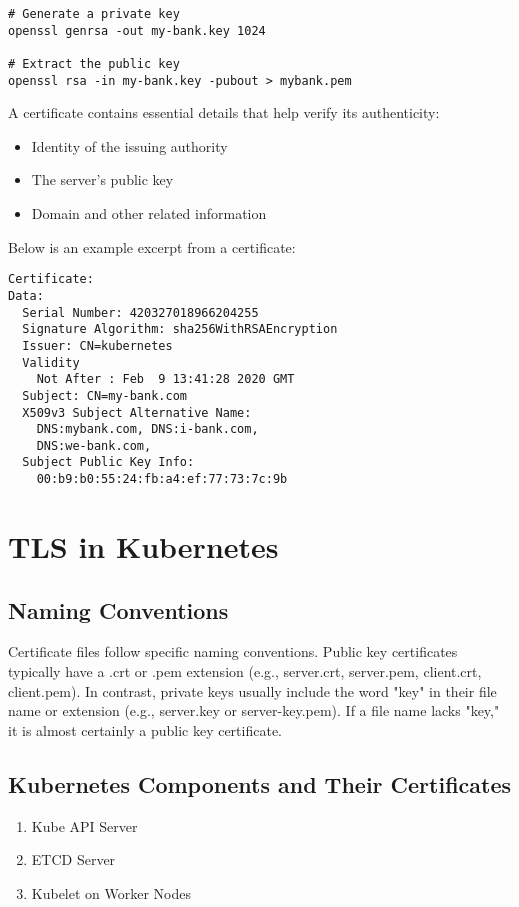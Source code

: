 \documentclass[11pt]{article}
\begin{document}
\begin{verbatim}
# Generate a private key
openssl genrsa -out my-bank.key 1024

# Extract the public key
openssl rsa -in my-bank.key -pubout > mybank.pem
\end{verbatim}

A certificate contains essential details that help verify its authenticity:

\begin{itemize}
\item Identity of the issuing authority
\item The server’s public key
\item Domain and other related information
\end{itemize}

Below is an example excerpt from a certificate:

\begin{verbatim}
Certificate:
Data:
  Serial Number: 420327018966204255
  Signature Algorithm: sha256WithRSAEncryption
  Issuer: CN=kubernetes
  Validity
    Not After : Feb  9 13:41:28 2020 GMT
  Subject: CN=my-bank.com
  X509v3 Subject Alternative Name:
    DNS:mybank.com, DNS:i-bank.com,
    DNS:we-bank.com,
  Subject Public Key Info:
    00:b9:b0:55:24:fb:a4:ef:77:73:7c:9b
\end{verbatim}
\section{TLS in Kubernetes}
\label{sec:org0915cba}

\subsection{Naming Conventions}
\label{sec:org538ed66}

Certificate files follow specific naming conventions. Public key certificates typically have a .crt or .pem extension (e.g., server.crt, server.pem, client.crt, client.pem). In contrast, private keys usually include the word "key" in their file name or extension (e.g., server.key or server-key.pem). If a file name lacks "key," it is almost certainly a public key certificate.
\subsection{Kubernetes Components and Their Certificates}
\label{sec:orgefaf720}

\begin{enumerate}
\item Kube API Server
\item ETCD Server
\item Kubelet on Worker Nodes
\end{enumerate}
\end{document}
